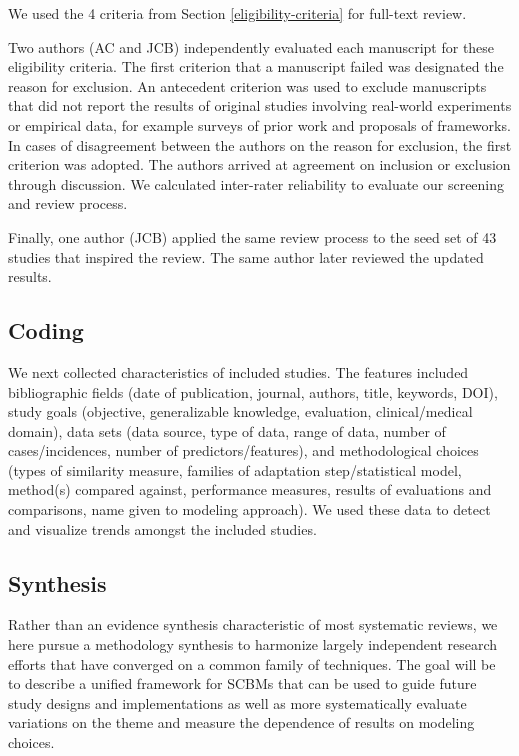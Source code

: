 \documentclass[sn-mathphys,Numbered,pdflatex]{sn-jnl}
\theoremstyle{remark}
\theoremstyle{definition}
\newcommand{\hl}[1]{#1}
\begin{document}
We \hl{used the} 4 criteria\hl{ from Section }\ref{eligibility-criteria}
for full-text review\hl{.}

\hl{Two} authors (AC and JCB) independently evaluated each manuscript
for these eligibility criteria. The first criterion that a manuscript
failed was designated the reason for exclusion. An antecedent criterion
was used to exclude manuscripts that did not report the results of
original studies involving real-world experiments or empirical data, for
example surveys of prior work and proposals of frameworks. In cases of
disagreement between the authors on the reason for exclusion, the first
criterion was adopted. The authors arrived at agreement on inclusion or
exclusion through discussion. We calculated inter-rater reliability to
evaluate our screening and review process.

Finally, one author (JCB) applied the same review process to the seed
set of 43 studies that inspired the review. The same author later
reviewed the updated results.

\subsection{Coding}\label{coding}

We next collected characteristics of included studies. The features
included bibliographic fields (date of publication, journal, authors,
title, keywords, DOI), study goals (objective, generalizable knowledge,
evaluation, clinical/medical domain), data sets (data source, type of
data, range of data, number of cases/incidences, number of
predictors/features), and methodological choices (types of similarity
measure, families of adaptation step/statistical model, method(s)
compared against, performance measures, results of evaluations and
comparisons, name given to modeling approach). We used these data to
detect and visualize trends amongst the included studies.

\subsection{Synthesis}\label{synthesis}

Rather than an evidence synthesis characteristic of most systematic
reviews, we here pursue a methodology synthesis to harmonize largely
independent research efforts that have converged on a common family of
techniques. The goal will be to describe a unified framework for
\hl{SCBM}s that can be used to guide future study designs and
implementations as well as more systematically evaluate variations on
the theme and measure the dependence of results on modeling choices.
\end{document}
